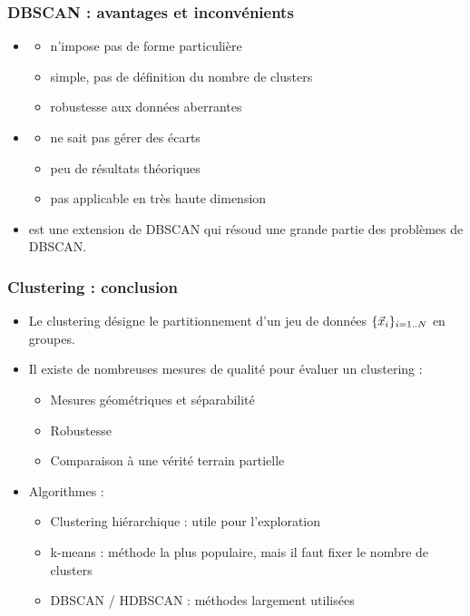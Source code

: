 \begin{frame}
  \frametitle{DBSCAN : avantages et inconvénients}
  \begin{itemize}
  \item {}
    \begin{itemize}
    \item n'impose pas de forme particulière
    \item simple, pas de définition du nombre de clusters
    \item robustesse aux données aberrantes
    \end{itemize}
  \pause
  \item {}
    \begin{itemize}
    \item ne sait pas gérer des écarts
    \item peu de résultats théoriques
    \item pas applicable en très haute dimension 
    \end{itemize}
    \pause
    \item {} est une extension de DBSCAN qui résoud une grande partie des problèmes de DBSCAN. 
  \end{itemize}
\end{frame}


\begin{frame}
  \frametitle{Clustering : conclusion}
  \begin{itemize}
    \item Le clustering désigne le partitionnement d'un jeu de données $\{\vec{x}_i\}_{i=1..N}$ en groupes.
    \item Il existe de nombreuses mesures de qualité pour évaluer un clustering :
    \begin{itemize}
      \item Mesures géométriques et séparabilité
      \item Robustesse
      \item Comparaison à une vérité terrain partielle
    \end{itemize}
    \item Algorithmes :
    \begin{itemize}
      \item Clustering hiérarchique : utile pour l'exploration
      \item k-means : méthode la plus populaire, mais il faut fixer le nombre de clusters
      \item DBSCAN / HDBSCAN : méthodes largement utilisées
    \end{itemize}
  \end{itemize}
\end{frame}

